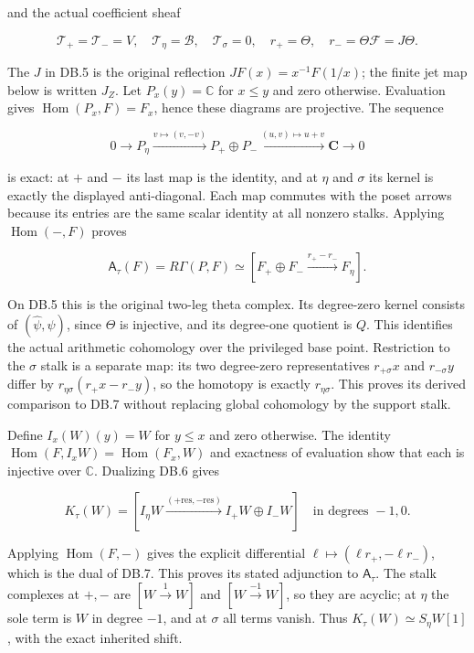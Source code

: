 \documentclass{article}
\begin{document}
and the actual coefficient sheaf

\[
\mathcal T_+=\mathcal T_-=V,\quad
\mathcal T_\eta=\mathscr B,\quad\mathcal T_\sigma=0,
\quad r_+=\Theta,\quad r_-=\Theta\mathcal F=J\Theta.
\tag{DB.5}
\]

The \(J\) in DB.5 is the original reflection \(JF(x)=x^{-1}F(1/x)\); the finite jet map below is written \(J_Z\). Let \(P_x(y)=\mathbb C\) for \(x\le y\) and zero otherwise. Evaluation gives \(\operatorname{Hom}(P_x,F)=F_x\), hence these diagrams are projective. The sequence

\[
0\to P_\eta\xrightarrow{v\mapsto(v,-v)}P_+\oplus P_-
 \xrightarrow{(u,v)\mapsto u+v}\mathbf C\to0
\tag{DB.6}
\]

is exact: at \(+\) and \(-\) its last map is the identity, and at \(\eta\) and \(\sigma\) its kernel is exactly the displayed anti-diagonal. Each map commutes with the poset arrows because its entries are the same scalar identity at all nonzero stalks. Applying \(\operatorname{Hom}(-,F)\) proves

\[
\mathsf A_\tau(F)=R\Gamma(P,F)
\simeq[F_+\oplus F_-\xrightarrow{r_+-r_-}F_\eta].
\tag{DB.7}
\]

On DB.5 this is the original two-leg theta complex. Its degree-zero kernel consists of \((\widehat\psi,\psi)\), since \(\Theta\) is injective, and its degree-one quotient is \(Q\). This identifies the actual arithmetic cohomology over the privileged base point. Restriction to the \(\sigma\) stalk is a separate map: its two degree-zero representatives \(r_{+\sigma}x\) and \(r_{-\sigma}y\) differ by \(r_{\eta\sigma}(r_+x-r_-y)\), so the homotopy is exactly \(r_{\eta\sigma}\). This proves its derived comparison to DB.7 without replacing global cohomology by the support stalk.

Define \(I_x(W)(y)=W\) for \(y\le x\) and zero otherwise. The identity \(\operatorname{Hom}(F,I_xW)=\operatorname{Hom}(F_x,W)\) and exactness of evaluation show that each is injective over \(\mathbb C\). Dualizing DB.6 gives

\[
K_\tau(W)=
[I_\eta W\xrightarrow{(+\mathrm{res},-\mathrm{res})}
 I_+W\oplus I_-W]
\quad\text{in degrees }-1,0.
\tag{DB.8}
\]

Applying \(\operatorname{Hom}(F,-)\) gives the explicit differential \(\ell\mapsto(\ell r_+,-\ell r_-)\), which is the dual of DB.7. This proves its stated adjunction to \(\mathsf A_\tau\). The stalk complexes at \(+,-\) are \([W\xrightarrow{1}W]\) and \([W\xrightarrow{-1}W]\), so they are acyclic; at \(\eta\) the sole term is \(W\) in degree \(-1\), and at \(\sigma\) all terms vanish. Thus \(K_\tau(W)\simeq S_\eta W[1]\), with the exact inherited shift.
\end{document}

